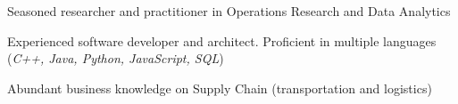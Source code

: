 

\cventry
{} %
{} %
{} %
{} %
{
\begin{cvitems} 	%
	\item  {Seasoned researcher and practitioner in Operations Research and Data Analytics}
	\item  {Experienced software developer and architect. Proficient in multiple languages (\textit{C++, Java, Python, JavaScript, SQL})} 
	\item  {Abundant business knowledge on Supply Chain (transportation and logistics)} 
\end{cvitems}    
}

